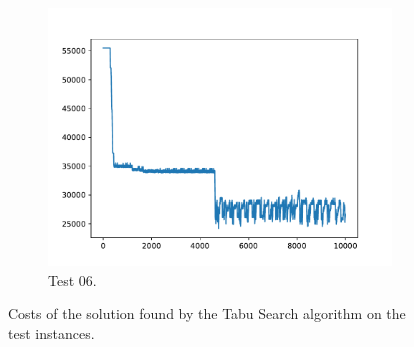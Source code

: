 \begin{figure}[h!]
\begin{subfigure}{0.35
            \textwidth}
        \includegraphics[width=\textwidth]{../logs/test06.pdf}
        \caption{Test $06$.}
    \end{subfigure}
    \caption{Costs of the solution found by the Tabu Search algorithm on the test instances.}
    \label{fig:plot}
\end{figure}
